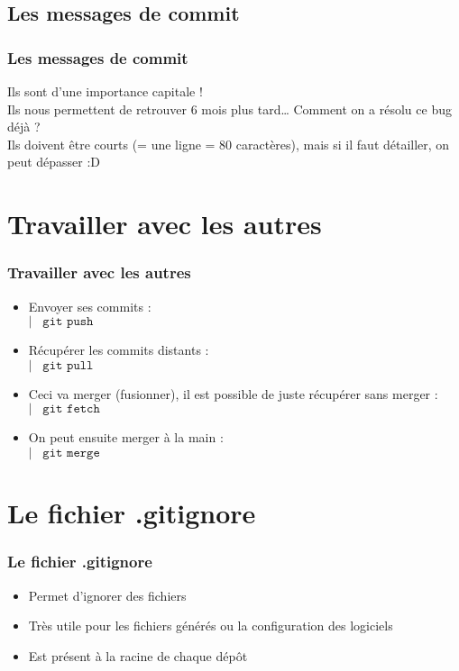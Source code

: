 \documentclass[9pt,a9paper,handout]{beamer}
\newcommand{\command}[1]{$\left|\;\;\;\texttt{#1}\right.$}
\begin{document}
\subsection{Les messages de commit}
\begin{frame}
\frametitle{Les messages de commit}
Ils sont d'une importance capitale !\\

Ils nous permettent de retrouver 6 mois plus tard… Comment on a résolu ce bug déjà ?\\

Ils doivent être courts (= une ligne = 80 caractères), mais si il faut détailler, on peut dépasser :D
\end{frame}


\section{Travailler avec les autres}
\begin{frame}
\frametitle{Travailler avec les autres}
\begin{itemize}
    \item Envoyer ses commits : \\\command{git push}
    \item Récupérer les commits distants : \\\command{git pull}\\
    \item Ceci va merger (fusionner), il est possible de juste récupérer sans merger :\\\command{git fetch}
    \item On peut ensuite merger à la main :\\\command{git merge}
\end{itemize}
\end{frame}

\section{Le fichier .gitignore}
\begin{frame}
\frametitle{Le fichier .gitignore}
\begin{itemize}
    \item Permet d'ignorer des fichiers
    \item Très utile pour les fichiers générés ou la configuration des logiciels
    \item Est présent à la racine de chaque dépôt
\end{itemize}
\end{frame}
\end{document}
